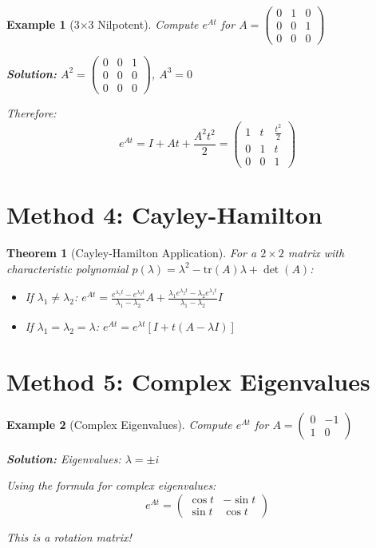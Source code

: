 \documentclass[12pt]{article}
\newtheorem{theorem}{Theorem}
\newtheorem{example}{Example}
\begin{document}
\begin{example}[3$\times $3 Nilpotent]
Compute $e^{At}$ for $A = \begin{pmatrix} 0 & 1 & 0 \\ 0 & 0 & 1 \\ 0 & 0 & 0 \end{pmatrix}$

\textbf{Solution:}
$A^{2} = \begin{pmatrix} 0 & 0 & 1 \\ 0 & 0 & 0 \\ 0 & 0 & 0 \end{pmatrix}$, $A^{3} = 0$

Therefore:
\[e^{At} = I + At + \frac{A^{2}t^2}{2} = \begin{pmatrix} 1 & t & \frac{t^{2}}{2} \\ 0 & 1 & t \\ 0 & 0 & 1 \end{pmatrix}\]
\end{example}

\section{Method 4: Cayley-Hamilton}

\begin{theorem}[Cayley-Hamilton Application]
For a $2\times 2$ matrix with characteristic polynomial $p(\lambda) = \lambda^{2} - \text{tr}(A)\lambda + \det(A)$:
\begin{itemize}
\item If $\lambda_{1} \neq \lambda_{2}$: $e^{At} = \frac{e^{\lambda_{1} t} - e^{\lambda_{2} t}}{\lambda_{1} - \lambda_{2}}A + \frac{\lambda_{1} e^{\lambda_{2} t} - \lambda_{2} e^{\lambda_{1} t}}{\lambda_{1} - \lambda_{2}}I$
\item If $\lambda_{1} = \lambda_{2} = \lambda$: $e^{At} = e^{\lambda t}[I + t(A - \lambda I)]$
\end{itemize}
\end{theorem}

\section{Method 5: Complex Eigenvalues}

\begin{example}[Complex Eigenvalues]
Compute $e^{At}$ for $A = \begin{pmatrix} 0 & -1 \\ 1 & 0 \end{pmatrix}$

\textbf{Solution:}
Eigenvalues: $\lambda = \pm i$

Using the formula for complex eigenvalues:
\[e^{At} = \begin{pmatrix} \cos t & -\sin t \\ \sin t & \cos t \end{pmatrix}\]

This is a rotation matrix!
\end{example}
\end{document}
